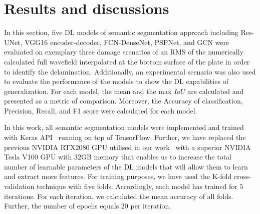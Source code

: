 \documentclass[runningheads]{llncs}
\begin{document}
\section{Results and discussions}
\label{section:results_and_discussions}
In this section, five DL models of semantic segmentation approach including  Res-UNet, VGG16 encoder-decoder, FCN-DenseNet, PSPNet, and GCN were evaluated on exemplary three damage scenarios of an RMS of the numerically calculated full wavefield interpolated at the bottom surface of the plate in order to identify the delamination.
Additionally, an experimental scenario was also used to evaluate the performance of the models to show the DL capabilities of generalization.
For each model, the mean and the max \(IoU\) are calculated and presented as a metric of comparison.
Moreover, the Accuracy of classification, Precision, Recall, and F1 score were calculated for each model.
%

In this work, all semantic segmentation models were implemented and trained with Keras API~\cite{chollet2015keras} running on top of TensorFlow.
Further, we have replaced the previous NVIDIA RTX2080 GPU utilised in our work~\cite{Ijjeh2021} with a superior NVIDIA Tesla V100 GPU with \(32\)GB memory that enables us to increase the total number of learnable parameters of the DL models that will allow them to learn and extract more features. 
For training purposes, we have used the K-fold cross-validation technique with five folds. 
Accordingly, each model has trained for \(5\) iterations. 
For each iteration, we calculated the mean accuracy of all folds.
Further, the number of epochs equals \(20\) per iteration.
\end{document}
